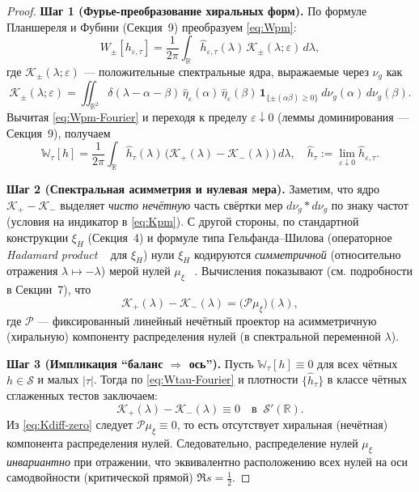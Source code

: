 \documentclass{article}
\numberwithin{equation}{section}
\theoremstyle{plain}
\theoremstyle{definition}
\theoremstyle{remark}
\def\Rightarrow{⇒}%
\def\alpha{α}\def\beta{β}\def\gamma{γ}\def\Gamma{Γ}%
\def\delta{δ}\def\Delta{Δ}\def\epsilon{ε}\def\zeta{ζ}%
\def\eta{η}\def\mu{μ}\def\nu{ν}\def\lambda{λ}\def\Lambda{Λ}%
\begin{document}
\begin{proof}
\textbf{Шаг 1 (Фурье-преобразование хиральных форм).}
По формуле Планшереля и Фубини (Секция~9) преобразуем \eqref{eq:Wpm}:
\begin{equation}
\label{eq:Wpm-Fourier}
W_\pm[h_{\varepsilon,\tau}]
=\frac{1}{2\pi}\int_{\mathbb R} 
\widehat h_{\varepsilon,\tau}(\lambda)\,
\mathcal K_\pm(\lambda;\varepsilon)\,d\lambda,
\end{equation}
где $\mathcal K_\pm(\lambda;\varepsilon)$ — положительные спектральные ядра, выражаемые через $\nu_g$ как
\begin{equation}
\label{eq:Kpm}
\mathcal K_\pm(\lambda;\varepsilon)
=\iint_{\mathbb R^2} 
\delta(\lambda-\alpha-\beta)\,
\widehat\eta_\varepsilon(\alpha)\,\widehat\eta_\varepsilon(\beta)\,
\mathbf 1_{\{\pm(\alpha\beta)\ge 0\}}\ d\nu_g(\alpha)\,d\nu_g(\beta).
\end{equation}
Вычитая \eqref{eq:Wpm-Fourier} и переходя к пределу $\varepsilon\downarrow 0$
(леммы доминирования — Секция~9), получаем
\begin{equation}
\label{eq:Wtau-Fourier}
\mathbb W_\tau[h]
=\frac{1}{2\pi}\int_{\mathbb R} \widehat h_\tau(\lambda)\,
\Big(\mathcal K_+(\lambda)-\mathcal K_-(\lambda)\Big)\,d\lambda,
\quad \widehat h_\tau:=\lim_{\varepsilon\downarrow 0}\widehat h_{\varepsilon,\tau}.
\end{equation}

\textbf{Шаг 2 (Спектральная асимметрия и нулевая мера).}
Заметим, что ядро $\mathcal K_+-\mathcal K_-$ выделяет \emph{чисто нечётную} часть свёртки мер $d\nu_g\!\ast d\nu_g$ по знаку частот (условия на индикатор в \eqref{eq:Kpm}).
С другой стороны, по стандартной конструкции $\xi_H$ (Секция~4) и формуле типа Гельфанда–Шилова (операторное \emph{Hadamard product} ~\cite{Titchmarsh1986} 
для $\xi_H$) нули $\xi_H$ кодируются \emph{симметричной} (относительно отражения $\lambda\mapsto -\lambda$) мерой нулей $\mu_\xi$ ~\cite{Voros1987}.
Вычисления показывают (см. подробности в Секции~7), что
\begin{equation}
\label{eq:Kdiff-zero}
\mathcal K_+(\lambda)-\mathcal K_-(\lambda)
= \big(\mathcal P\mu_\xi\big)(\lambda),
\end{equation}
где $\mathcal P$ — фиксированный линейный нечётный проектор на асимметричную (хиральную) компоненту распределения нулей (в спектральной переменной $\lambda$).

\textbf{Шаг 3 (Импликация ``баланс $\Rightarrow$ ось'').}
Пусть $\mathbb W_\tau[h]\equiv 0$ для всех чётных $h\in\mathcal S$ и малых $|\tau|$.
Тогда по \eqref{eq:Wtau-Fourier} и плотности $\{\widehat h_\tau\}$ в классе чётных сглаженных тестов заключаем:
\begin{equation}
\label{eq:Kdiff-0}
\mathcal K_+(\lambda)-\mathcal K_-(\lambda)\equiv 0
\quad\text{в }\ \mathcal S'(\mathbb R).
\end{equation}
Из \eqref{eq:Kdiff-zero} следует $\mathcal P\mu_\xi\equiv 0$, то есть отсутствует хиральная (нечётная) компонента распределения нулей.
Следовательно, распределение нулей $\mu_\xi$ \emph{инвариантно} при отражении, что эквивалентно расположению всех нулей на оси самодвойности (критической прямой) $\Re s=\tfrac12$.


\end{proof}
\end{document}
